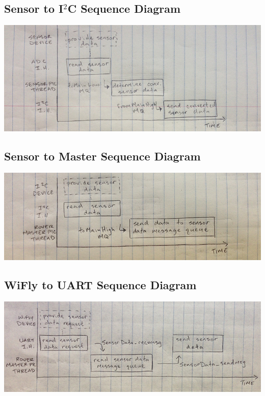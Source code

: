 \subsection*{Sensor to I$^2$C Sequence Diagram}
\begin{center}
	\includegraphics[scale=0.5]{Images/SensortoI2C.jpg}
\end{center}

\subsection*{Sensor to Master Sequence Diagram}
\begin{center}
	\includegraphics[scale=0.5]{Images/SensortoMaster.jpg}
\end{center}

\subsection*{WiFly to UART Sequence Diagram}
\begin{center}
	\includegraphics[scale=0.5]{Images/WiFlytoUART.jpg}
\end{center}

